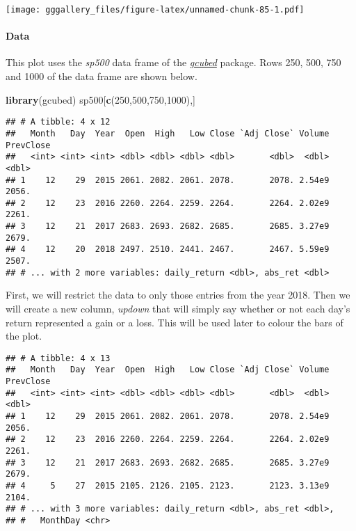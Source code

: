 \documentclass[]{book}
\newenvironment{Shaded}{\begin{snugshade}}{\end{snugshade}}
\newcommand{\DecValTok}[1]{\textcolor[rgb]{0.00,0.00,0.81}{#1}}
\newcommand{\KeywordTok}[1]{\textcolor[rgb]{0.13,0.29,0.53}{\textbf{#1}}}
\newcommand{\NormalTok}[1]{#1}
\let\oldparagraph\paragraph
\renewcommand{\paragraph}[1]{\oldparagraph{#1}\mbox{}}
\begin{document}
\texttt{[image: gggallery\_files/figure-latex/unnamed-chunk-85-1.pdf]}

\hypertarget{spfourdata}{%
\paragraph{Data}\label{spfourdata}}

This plot uses the \emph{sp500} data frame of the \protect\hyperlink{gcubed}{\emph{gcubed}} package. Rows 250, 500, 750 and 1000 of the data frame are shown below.

\begin{Shaded}
\begin{Highlighting}[]
\KeywordTok{library}\NormalTok{(gcubed)}
\NormalTok{sp500[}\KeywordTok{c}\NormalTok{(}\DecValTok{250}\NormalTok{,}\DecValTok{500}\NormalTok{,}\DecValTok{750}\NormalTok{,}\DecValTok{1000}\NormalTok{),]}
\end{Highlighting}
\end{Shaded}

\begin{verbatim}
## # A tibble: 4 x 12
##   Month   Day  Year  Open  High   Low Close `Adj Close` Volume PrevClose
##   <int> <int> <int> <dbl> <dbl> <dbl> <dbl>       <dbl>  <dbl>     <dbl>
## 1    12    29  2015 2061. 2082. 2061. 2078.       2078. 2.54e9     2056.
## 2    12    23  2016 2260. 2264. 2259. 2264.       2264. 2.02e9     2261.
## 3    12    21  2017 2683. 2693. 2682. 2685.       2685. 3.27e9     2679.
## 4    12    20  2018 2497. 2510. 2441. 2467.       2467. 5.59e9     2507.
## # ... with 2 more variables: daily_return <dbl>, abs_ret <dbl>
\end{verbatim}

First, we will restrict the data to only those entries from the year 2018. Then we will create a new column, \emph{updown} that will simply say whether or not each day's return represented a gain or a loss. This will be used later to colour the bars of the plot.

\begin{verbatim}
## # A tibble: 4 x 13
##   Month   Day  Year  Open  High   Low Close `Adj Close` Volume PrevClose
##   <int> <int> <int> <dbl> <dbl> <dbl> <dbl>       <dbl>  <dbl>     <dbl>
## 1    12    29  2015 2061. 2082. 2061. 2078.       2078. 2.54e9     2056.
## 2    12    23  2016 2260. 2264. 2259. 2264.       2264. 2.02e9     2261.
## 3    12    21  2017 2683. 2693. 2682. 2685.       2685. 3.27e9     2679.
## 4     5    27  2015 2105. 2126. 2105. 2123.       2123. 3.13e9     2104.
## # ... with 3 more variables: daily_return <dbl>, abs_ret <dbl>,
## #   MonthDay <chr>
\end{verbatim}
\end{document}
